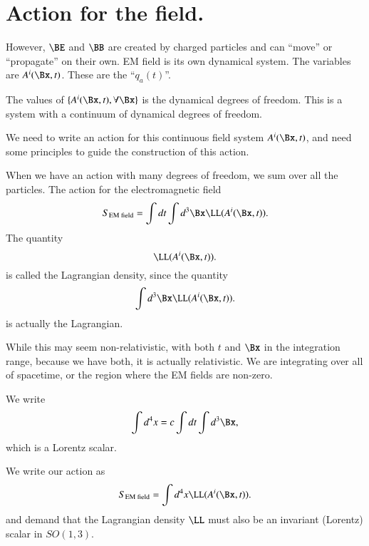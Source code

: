 %
%
\section{Action for the field.}

However, \(\BE\) and \(\BB\) are created by charged particles and can ``move'' or ``propagate'' on their own.  EM field is its own dynamical system.  The variables are \(A^i(\Bx, t)\).  These are the ``\(q_a(t)\)''.

The values of \(\{A^i(\Bx, t), \forall \Bx\}\) is the dynamical degrees of freedom.  This is a system with a continuum of dynamical degrees of freedom.

We need to write an action for this continuous field system \(A^i(\Bx,t)\), and need some principles to guide the construction of this action.

When we have an action with many degrees of freedom, we sum over all the particles.  The action for the electromagnetic field
%
\begin{equation}\label{eqn:relativisticElectrodynamicsL12b:90}
S_{\text{EM field}} = \int dt \int d^3\Bx \LL(A^i(\Bx, t)).
\end{equation}
%
The quantity
%
\begin{equation}\label{eqn:relativisticElectrodynamicsL12b:110}
\LL(A^i(\Bx, t)).
\end{equation}
%
is called the Lagrangian density, since the quantity
%
\begin{equation}\label{eqn:relativisticElectrodynamicsL12b:130}
\int d^3\Bx \LL(A^i(\Bx, t)).
\end{equation}
%
is actually the Lagrangian.

While this may seem non-relativistic, with both \(t\) and \(\Bx\) in the integration range, because we have both, it is actually relativistic.  We are integrating over all of spacetime, or the region where the EM fields are non-zero.

We write
%
\begin{equation}\label{eqn:relativisticElectrodynamicsL12b:150}
\int d^4 x  = c \int dt \int d^3 \Bx,
\end{equation}
%
which is a Lorentz scalar.

We write our action as
%
\begin{equation}\label{eqn:relativisticElectrodynamicsL12b:170}
S_{\text{EM field}} = \int d^4 x \LL(A^i(\Bx, t)).
\end{equation}
%
and demand that the Lagrangian density \(\LL\) must also be an invariant (Lorentz) scalar in \(SO(1,3)\).
%
